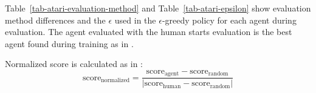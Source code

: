\documentclass[a4paper]{article}
\newcommand{\atariscore}[1]{\text{score}_\text{#1}}
\begin{document}
Table~\ref{tab-atari-evaluation-method} and Table~\ref{tab-atari-epsilon} show evaluation method differences and the $\epsilon$ used in the $\epsilon$-greedy policy for each agent during evaluation.  The agent evaluated with the human starts evaluation is the best agent found during training as in \citep{double-dqn}.

\begin{table*}[!hpt]
\centering


\caption{
\label{tab-atari-evaluation-method}
Evaluation method comparison.
}
\end{table*}

\begin{table*}[!hpt]
\centering


\caption{
\label{tab-atari-epsilon}
The $\epsilon$ used in the $\epsilon$-greedy policy for each agent, for each evaluation method.
}
\end{table*}

Normalized score is calculated as in \citep{double-dqn}:
\begin{equation}
\label{eq-norm-score}
	\atariscore{normalized} = \frac{\atariscore{agent} - \atariscore{random}}{\left|\atariscore{human} - \atariscore{random}\right|}
\end{equation}
\end{document}
